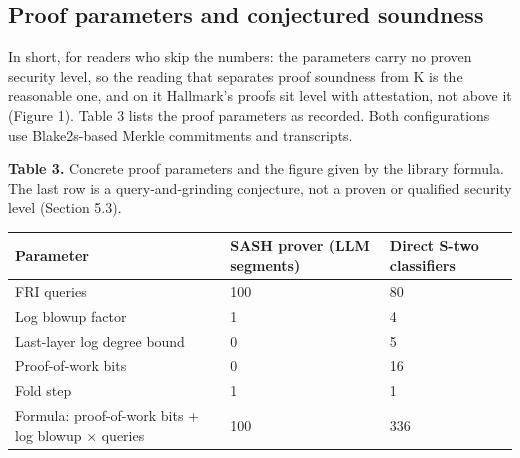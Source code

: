 \documentclass[11pt]{article}
\begin{document}
\subsection{Proof parameters and conjectured soundness}

In short, for readers who skip the numbers: the parameters carry no proven security level, so the reading that separates proof soundness from K is the reasonable one, and on it Hallmark's proofs sit level with attestation, not above it (Figure 1). Table 3 lists the proof parameters as recorded. Both configurations use Blake2s-based Merkle commitments and transcripts.

\textbf{Table 3.} Concrete proof parameters and the figure given by the library formula. The last row is a query-and-grinding conjecture, not a proven or qualified security level (Section 5.3).

{\small
\begin{xltabular}{\linewidth}{XXX}
\toprule
\textbf{Parameter} & \textbf{SASH prover (LLM segments)} & \textbf{Direct S-two classifiers} \\ \midrule
\endhead
FRI queries & 100 & 80 \\
Log blowup factor & 1 & 4 \\
Last-layer log degree bound & 0 & 5 \\
Proof-of-work bits & 0 & 16 \\
Fold step & 1 & 1 \\
Formula: proof-of-work bits + log blowup × queries & 100 & 336 \\
\bottomrule
\end{xltabular}}
\end{document}
